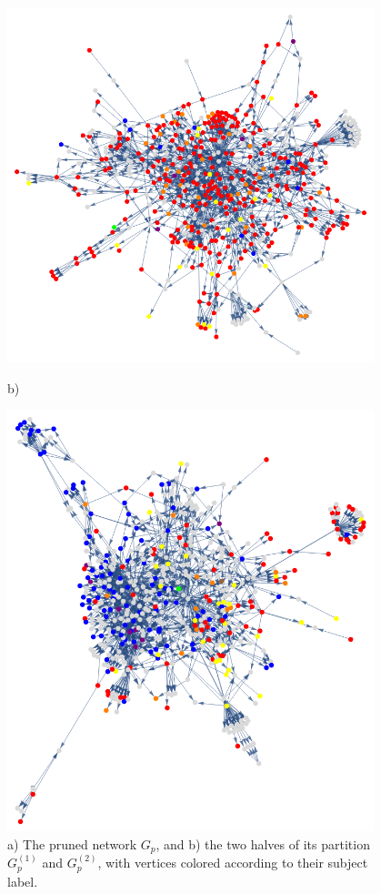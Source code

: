 \documentclass[12pt]{thesis}
\theoremstyle{plain}
\theoremstyle{definition}
\theoremstyle{remark}
\begin{document}
\begin{figure}[p]
\begin{minipage}[c]{0.7\textwidth}
\end{minipage}
\begin{minipage}[c]{0.49\textwidth}
\includegraphics[width=0.95\textwidth]{color_coded_left.png}

b)
\vspace{-16pt}
\end{minipage}
\hfill
\begin{minipage}[c]{0.49\textwidth}
\includegraphics[width=0.95\textwidth]{color_coded_right.png}
\end{minipage}
\caption{a) The pruned network $G_p$, and b) the two halves of its partition $G_p^{(1)}$ and $G_p^{(2)}$, with vertices colored according to their subject label.}
\label{fig:subject_color_coded}
\end{figure}
\end{document}
